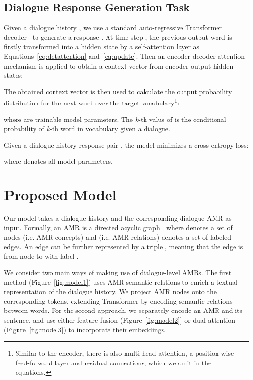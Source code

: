 \documentclass[11pt,a4paper]{article}
\begin{document}
\subsection{Dialogue Response Generation Task}
Given a dialogue history , we use a standard auto-regressive Transformer decoder~\cite{vaswani2017attention} to generate a response .
At time step , the previous output word  is firstly transformed into a hidden state  by a self-attention layer as Equations~\ref{eq:dotattention} and~\ref{eq:update}.
Then an encoder-decoder attention mechanism is applied to obtain a context vector from encoder output hidden states:


The obtained context vector  is then used to calculate the output probability distribution for the next word  over the target
vocabulary\footnote{Similar to the encoder, there is also multi-head attention, a position-wise feed-forward layer and residual connections, which we omit in the equations.}:

where  are trainable model parameters. The \textit{k}-th value of  is the conditional probability of \textit{k}-th word in vocabulary given a dialogue.

Given a dialogue history-response pair , the model minimizes a cross-entropy loss:

where  denotes all model parameters.

\section{Proposed Model}
Our model takes a dialogue history  and the corresponding dialogue AMR as input. 
Formally, an AMR is a directed acyclic graph , where  denotes a set of nodes (i.e. AMR concepts) and  (i.e. AMR relations) denotes a set of labeled edges.
An edge can be further represented by a triple , meaning that the edge is from node  to  with label .




We consider two main ways of making use of dialogue-level AMRs. 
The first method (Figure~\ref{fig:model1}) uses AMR semantic relations to enrich a textual representation of the dialogue history. 
We project AMR nodes onto the corresponding tokens, extending Transformer by encoding semantic relations between words.
For the second approach, we separately encode an AMR and its sentence, and use either feature fusion (Figure~\ref{fig:model2}) or dual attention (Figure~\ref{fig:model3}) to incorporate their embeddings.
\end{document}
